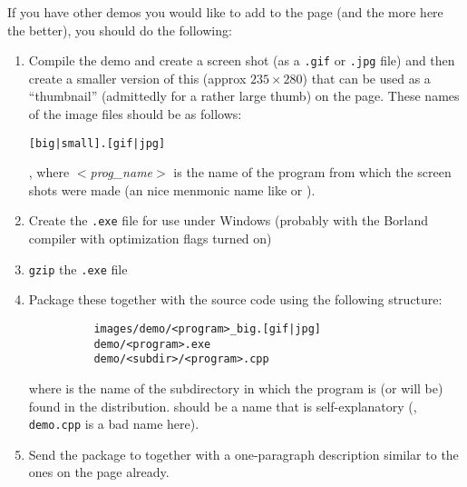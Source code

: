 If you have other demos you would like to add to the page (and the more 
here the better), you should do the following:
\begin{enumerate}
\item Compile the demo and create a screen shot (as a \texttt{.gif} or 
      \texttt{.jpg} file) and then create a smaller version of this 
      (approx $235 \times 280$) that can be used as a ``thumbnail'' 
      (admittedly for a rather large thumb) on the page.  These names of
      the image files should be as follows: 
      \centerline{\texttt{[big|small].[gif|jpg]}},
      where \textit{$<$prog\_name$>$} is the name of the program from which
      the screen shots were made (an nice menmonic name like 
       or ).

\item Create the \texttt{.exe} file for use under Windows (probably with the 
      Borland compiler with optimization flags turned on)
\item \texttt{gzip} the \texttt{.exe} file
\item Package these together with the source code using the following structure:
      \begin{verbatim}
          images/demo/<program>_big.[gif|jpg]
          demo/<program>.exe
          demo/<subdir>/<program>.cpp
      \end{verbatim}
      where  is the name of the subdirectory in which the program
      is (or will be) found in the distribution.  should be a 
      name that is self-explanatory (\eg, \texttt{demo.cpp} is a bad name here).

\item Send the package to  together with a one-paragraph description similar to the
      ones on the page already.
\end{enumerate}



